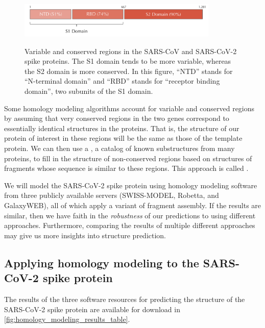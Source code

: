 \begin{figure}[h]
	\centering
	\mySfFamily
	\includegraphics[width = 0.85\textwidth]{../images/spike_protein_similarity.png}\\
	\caption{Variable and conserved regions in the SARS-CoV and SARS-CoV-2 spike proteins. The S1 domain tends to be more variable, whereas the S2 domain is more conserved. In this figure, ``NTD'' stands for ``N-terminal domain'' and ``RBD'' stands for ``receptor binding domain'', two subunits of the S1 domain.}
	\label{fig:spike_protein_similarity}
\end{figure}

Some homology modeling algorithms account for variable and conserved regions by assuming that very conserved regions in the two genes correspond to essentially identical structures in the proteins. That is, the structure of our protein of interest in these regions will be the same as those of the template protein. We can then use a , a catalog of known substructures from many proteins, to fill in the structure of non-conserved regions based on structures of fragments whose sequence is similar to these regions. This approach is called .

We will model the SARS-CoV-2 spike protein using homology modeling software from three publicly available servers (SWISS-MODEL, Robetta, and GalaxyWEB), all of which apply a variant of fragment assembly. If the results are similar, then we have faith in the \textit{robustness} of our predictions to using different approaches. Furthermore, comparing the results of multiple different approaches may give us more insights into structure prediction. 

\FloatBarrier
{}
\subsection{Applying homology modeling to the SARS-CoV-2 spike protein}

The results of the three software resources for predicting the structure of the SARS-CoV-2 spike protein are available for download in \autoref{fig:homology_modeling_results_table}.\\

